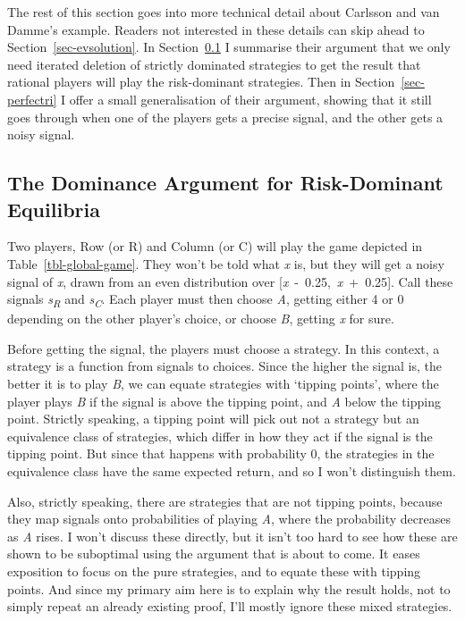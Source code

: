 \documentclass[
  12pt,
  letterpaper,
]{scrbook}
\begin{document}
The rest of this section goes into more technical detail about Carlsson
and van Damme's example. Readers not interested in these details can
skip ahead to Section~\ref{sec-evsolution}. In
Section~\ref{sec-cvdproof} I summarise their argument that we only need
iterated deletion of strictly dominated strategies to get the result
that rational players will play the risk-dominant strategies. Then in
Section~\ref{sec-perfectri} I offer a small generalisation of their
argument, showing that it still goes through when one of the players
gets a precise signal, and the other gets a noisy signal.

\subsection{The Dominance Argument for Risk-Dominant
Equilibria}\label{sec-cvdproof}

Two players, Row (or R) and Column (or C) will play the game depicted in
Table~\ref{tbl-global-game}. They won't be told what \emph{x} is, but
they will get a noisy signal of \emph{x}, drawn from an even
distribution over {[}\emph{x}~-~0.25,~\emph{x}~+~0.25{]}. Call these
signals \emph{s\textsubscript{R}} and \emph{s\textsubscript{C}}. Each
player must then choose \emph{A}, getting either 4 or 0 depending on the
other player's choice, or choose \emph{B}, getting \emph{x} for sure.

Before getting the signal, the players must choose a strategy. In this
context, a strategy is a function from signals to choices. Since the
higher the signal is, the better it is to play \emph{B}, we can equate
strategies with `tipping points', where the player plays \emph{B} if the
signal is above the tipping point, and \emph{A} below the tipping point.
Strictly speaking, a tipping point will pick out not a strategy but an
equivalence class of strategies, which differ in how they act if the
signal is the tipping point. But since that happens with probability 0,
the strategies in the equivalence class have the same expected return,
and so I won't distinguish them.

Also, strictly speaking, there are strategies that are not tipping
points, because they map signals onto probabilities of playing \emph{A},
where the probability decreases as \emph{A} rises. I won't discuss these
directly, but it isn't too hard to see how these are shown to be
suboptimal using the argument that is about to come. It eases exposition
to focus on the pure strategies, and to equate these with tipping
points. And since my primary aim here is to explain why the result
holds, not to simply repeat an already existing proof, I'll mostly
ignore these mixed strategies.
\end{document}
